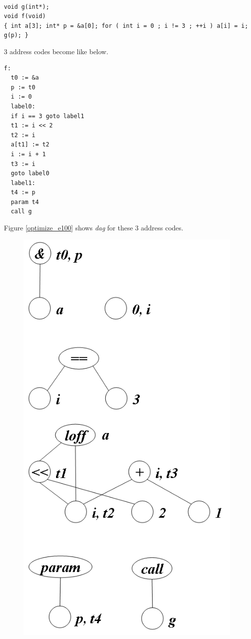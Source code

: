 \begin{Example}
\label{optimize_e099}
\begin{verbatim}

void g(int*);
void f(void)
{ int a[3]; int* p = &a[0]; for ( int i = 0 ; i != 3 ; ++i ) a[i] = i; g(p); }
\end{verbatim}
3 address codes become like below.
\begin{verbatim}
f:
  t0 := &a
  p := t0
  i := 0
  label0:
  if i == 3 goto label1
  t1 := i << 2
  t2 := i
  a[t1] := t2
  i := i + 1
  t3 := i
  goto label0
  label1:
  t4 := p
  param t4
  call g
\end{verbatim}
Figure \ref{optimize_e100} shows {\em dag} for these 3 address codes.
\begin{figure}[htbp]
\begin{center}
\begin{htmlonly}
\includegraphics[width=0.619\linewidth,height=1.2\linewidth]{opt043.png}
\end{htmlonly}
\begin{latexonly}

\end{latexonly}
\end{center}
\end{figure}
\end{Example}

